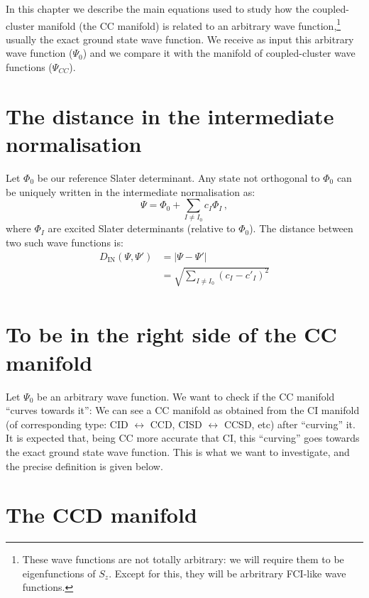 In this chapter we describe the main equations used to study how the coupled-cluster manifold
(the CC manifold)
is related to an arbitrary wave function,\footnote{
  These wave functions are not totally arbitrary:
  we will require them to be eigenfunctions of $S_z$.
  Except for this, they will be arbritrary FCI-like wave functions.
  }
usually the exact ground state wave function.
We receive as input this arbitrary wave function ($\Psi_0$) and we compare it with the manifold
of coupled-cluster wave functions ($\Psi_{CC}$).

\section{The distance in the intermediate normalisation}

Let $\Phi_0$ be our reference Slater determinant.
Any state not orthogonal to $\Phi_0$ can be uniquely written in the intermediate normalisation as:
\begin{equation}
  \Psi = \Phi_0 + \sum_{I \ne I_0} c_I \Phi_I\,,
\end{equation}
where $\Phi_I$ are excited Slater determinants (relative to $\Phi_0$).
The distance between two such wave functions is:
\begin{equation}
  \begin{split}
    D_\text{IN}(\Psi,\Psi') &= |\Psi - \Psi'|\\
    &=\sqrt{\sum_{I \ne I_0} (c_I - c'_I)^2 }\\
  \end{split}
\end{equation}

\section{To be in the right side of the CC manifold}

Let $\Psi_0$ be an arbitrary wave function.
We want to check if the CC manifold ``curves towards it'':
We can see a CC  manifold as obtained from the CI manifold (of corresponding type:
CID $\leftrightarrow$ CCD, CISD $\leftrightarrow$ CCSD, etc)
after ``curving'' it.
It is expected that, being CC more accurate that CI, this ``curving'' goes towards the exact
ground state wave function.
This is what we want to investigate, and the precise definition is given below.

\section{The CCD manifold}

